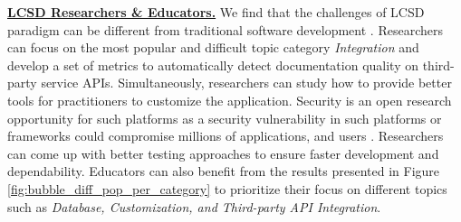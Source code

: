 \textbf{\ul{ LCSD Researchers \& Educators.}} We find that the
challenges of LCSD paradigm can be different from traditional software development \cite{sahay2020supporting}. Researchers can focus on the most popular
and difficult topic category \textit{Integration} and
develop a set of metrics to automatically detect documentation quality on
third-party service APIs. Simultaneously, researchers can study how to
provide better tools for practitioners to customize the application.
Security is an open research opportunity for such platforms as a security
vulnerability in such platforms or frameworks could compromise millions of applications, and users \cite{lin2020software}. Researchers can come
up with better testing approaches to ensure faster development and dependability. Educators can also benefit from the results presented in Figure
\ref{fig:bubble_diff_pop_per_category} to prioritize their focus on different topics such as \textit{Database, Customization, and Third-party API Integration}.







